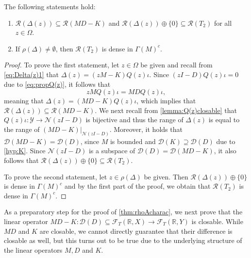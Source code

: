 \documentclass[english]{myarticle}
\begin{document}
\begin{sloppypar}
\begin{lemma} \label{lemma:T2onto}
The following statements hold:
\begin{enumerate}
    \item $\mathcal{R}(\Delta(z)) \subseteq \mathcal{R}(MD - K)$ and $\mathcal{R}(\Delta(z)) \oplus \{0\} \subseteq \mathcal{R}(T_2)$ for all $z \in \Omega$.
    \item If $\rho(\Delta) \neq \emptyset$, then $\mathcal{R}(T_2)$ is dense in $\Gamma(M)^c$.
\end{enumerate}
\end{lemma}
\begin{proof}
To prove the first statement, let $z \in \Omega$ be given and recall from \eqref{eq:Delta(z)1} that $\Delta(z) = (zM-K)Q(z)\iota$. Since $(zI - D) Q(z) \iota = 0$ due to \eqref{eq:propQ(z)}, it follows that
\begin{equation} \label{eq:zM_on_Q}
    z M Q(z) \iota = MD Q(z) \iota,
\end{equation}
meaning that $\Delta(z) = (MD-K)Q(z)\iota$, which implies that $\mathcal{R}(\Delta(z)) \subseteq \mathcal{R}(MD - K)$. We next recall from \cref{lemma:Q(z)closable} that $Q(z)\iota : \mathcal{Y} \to \mathcal{N}(z I-D)$ is bijective and thus the range of $\Delta(z)$ is equal to the range of $(MD - K)|_{\mathcal{N}(zI-D)}$. Moreover, it holds that $\mathcal{D}(MD - K) = \mathcal{D}(D)$, since $M$ is bounded and $\mathcal{D}(K) \supseteq \mathcal{D}(D)$ due to \ref{hyp:K}. Since $\mathcal{N}(zI-D)$ is a subspace of $\mathcal{D}(D) =\mathcal{D}(MD-K)$, it also follows that $\mathcal{R}(\Delta(z)) \oplus \{0\} \subseteq \mathcal{R}(T_2)$.

To prove the second statement, let $z \in \rho(\Delta)$ be given. Then $\mathcal{R}(\Delta(z)) \oplus \{0\}$ is dense in $\Gamma(M)^c$ and by the first part of the proof, we obtain that $\mathcal{R}(T_2)$ is dense in $\Gamma(M)^c$.
\end{proof}

As a preparatory step for the proof of \cref{thm:rhoAcharac}, we next prove that the linear operator $MD - K : \mathcal{D}(D) \subseteq \mathcal{F}_T(\mathbb{R},X) \to \mathcal{F}_T(\mathbb{R},Y)$ is closable. While $MD$ and $K$ are closable, we cannot directly guarantee that their difference is closable as well,
but this turns out to be true due to the underlying structure of the linear operators $M,D$ and $K$.


\end{sloppypar}
\end{document}
